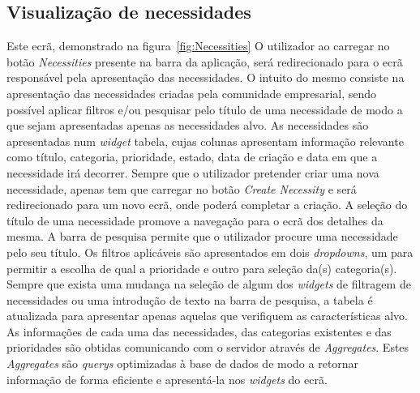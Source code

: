 \subsection{Visualização de necessidades}\label{subsec:implementacao:necessities}
Este ecrã, demonstrado na figura~\ref{fig:Necessities}
O utilizador ao carregar no botão \textit{Necessities} presente na barra da aplicação, será redirecionado para o ecrã responsável pela apresentação das necessidades. 
O intuito do mesmo consiste na apresentação das necessidades criadas pela comunidade empresarial, sendo possível aplicar filtros e/ou pesquisar pelo título de uma necessidade de modo a que sejam apresentadas apenas as necessidades alvo.
As necessidades são apresentadas num \textit{widget} tabela, cujas colunas apresentam informação relevante como título, categoria, prioridade, estado, data de criação e data em que a necessidade irá decorrer. Sempre que o utilizador pretender criar uma nova necessidade, apenas tem que carregar no botão \textit{Create Necessity} e será redirecionado para um novo ecrã, onde poderá completar a criação.
A seleção do título de uma necessidade promove a navegação para o ecrã dos detalhes da mesma.
A barra de pesquisa permite que o utilizador procure uma necessidade pelo seu título.
Os filtros aplicáveis são apresentados em dois \textit{dropdowns}, um para permitir a escolha de qual a prioridade e outro para seleção da(s) categoria(s).
Sempre que exista uma mudança na seleção de algum dos \textit{widgets} de filtragem de necessidades ou uma introdução de texto na barra de pesquisa, a tabela é atualizada para apresentar apenas aquelas que verifiquem as características alvo. 
As informações de cada uma das necessidades, das categorias existentes e das prioridades são obtidas comunicando com o servidor através de \textit{Aggregates}. 
Estes \textit{Aggregates} são \textit{querys} optimizadas à base de dados de modo a retornar informação de forma eficiente e apresentá-la nos \textit{widgets} do ecrã.


